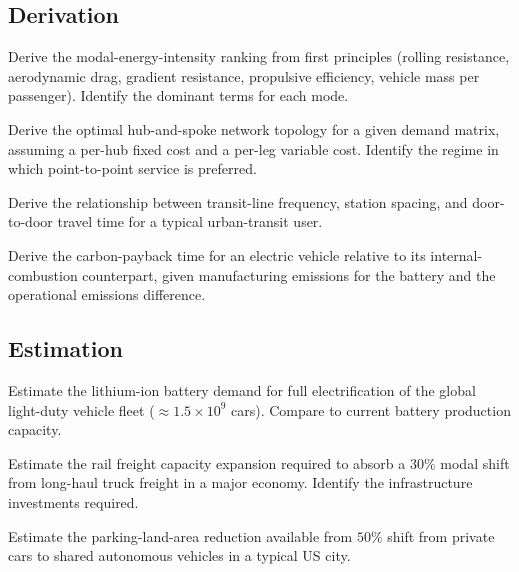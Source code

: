 \subsection*{Derivation}

\begin{exercise}
Derive the modal-energy-intensity ranking from first principles (rolling resistance, aerodynamic drag, gradient resistance, propulsive efficiency, vehicle mass per passenger). Identify the dominant terms for each mode.
\end{exercise}

\begin{exercise}
Derive the optimal hub-and-spoke network topology for a given demand matrix, assuming a per-hub fixed cost and a per-leg variable cost. Identify the regime in which point-to-point service is preferred.
\end{exercise}

\begin{exercise}
Derive the relationship between transit-line frequency, station spacing, and door-to-door travel time for a typical urban-transit user.
\end{exercise}

\begin{exercise}
Derive the carbon-payback time for an electric vehicle relative to its internal-combustion counterpart, given manufacturing emissions for the battery and the operational emissions difference.
\end{exercise}

\subsection*{Estimation}

\begin{exercise}
Estimate the lithium-ion battery demand for full electrification of the global light-duty vehicle fleet ($\approx 1.5 \times 10^9$ cars). Compare to current battery production capacity.
\end{exercise}

\begin{exercise}
Estimate the rail freight capacity expansion required to absorb a $30\%$ modal shift from long-haul truck freight in a major economy. Identify the infrastructure investments required.
\end{exercise}

\begin{exercise}
Estimate the parking-land-area reduction available from $50\%$ shift from private cars to shared autonomous vehicles in a typical US city.
\end{exercise}

